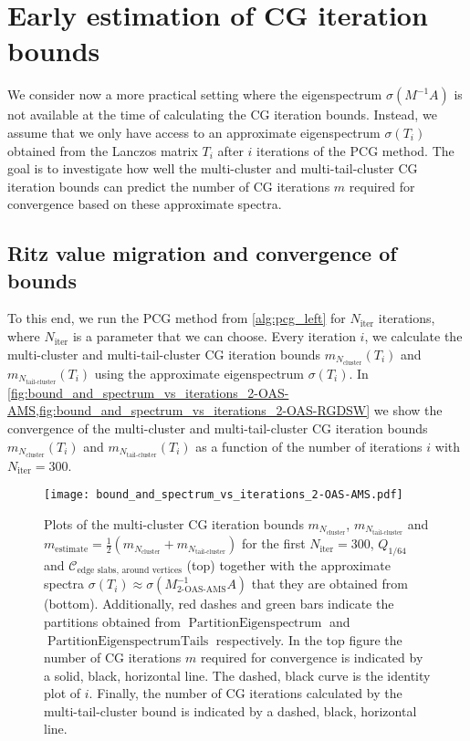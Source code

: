 \section{Early estimation of CG iteration bounds}\label{sec:early_estimation_of_iterations}
We consider now a more practical setting where the eigenspectrum $\sigma(M^{-1}A)$ is not available at the time of calculating the CG iteration bounds. Instead, we assume that we only have access to an approximate eigenspectrum $\sigma(T_i)$ obtained from the Lanczos matrix $T_i$ after $i$ iterations of the PCG method. The goal is to investigate how well the multi-cluster and multi-tail-cluster CG iteration bounds can predict the number of CG iterations $m$ required for convergence based on these approximate spectra.

\subsection{Ritz value migration and convergence of bounds}\label{sec:ritz_value_migration}
To this end, we run the PCG method from \cref{alg:pcg_left} for $N_{\text{iter}}$ iterations, where $N_{\text{iter}}$ is a parameter that we can choose. Every iteration $i$, we calculate the multi-cluster and multi-tail-cluster CG iteration bounds $m_{N_{\text{cluster}}}(T_i)$ and $m_{N_{\text{tail-cluster}}}(T_i)$ using the approximate eigenspectrum $\sigma(T_i)$. In \cref{fig:bound_and_spectrum_vs_iterations_2-OAS-AMS,fig:bound_and_spectrum_vs_iterations_2-OAS-RGDSW} we show the convergence of the multi-cluster and multi-tail-cluster CG iteration bounds $m_{N_{\text{cluster}}}(T_i)$ and $m_{N_{\text{tail-cluster}}}(T_i)$ as a function of the number of iterations $i$ with $N_{\text{iter}}=300$.
\begin{figure}[H]
    \centering
    \texttt{[image: bound\_and\_spectrum\_vs\_iterations\_2-OAS-AMS.pdf]}
    \caption{Plots of the multi-cluster CG iteration bounds $m_{N_{\text{cluster}}}$, $m_{N_{\text{tail-cluster}}}$ and $m_{\text{estimate}} = \frac{1}{2}(m_{N_{\text{cluster}}} + m_{N_{\text{tail-cluster}}})$ for the first $N_{\text{iter}}=300$, $Q_{1/64}$ and $\mathcal{C}_{\text{edge slabs, around vertices}}$ (top) together with the approximate spectra $\sigma(T_i) \approx \sigma(M^{-1}_{\text{2-OAS-AMS}}A)$ that they are obtained from (bottom). Additionally, red dashes and green bars indicate the partitions obtained from $\operatorname{PartitionEigenspectrum}$ and $\operatorname{PartitionEigenspectrumTails}$ respectively. In the top figure the number of CG iterations $m$ required for convergence is indicated by a solid, black, horizontal line. The dashed, black curve is the identity plot of $i$. Finally, the number of CG iterations calculated by the multi-tail-cluster bound is indicated by a dashed, black, horizontal line.}
    \label{fig:bound_and_spectrum_vs_iterations_2-OAS-AMS}
\end{figure}
